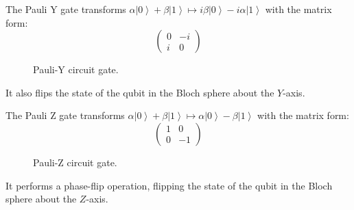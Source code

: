 \documentclass{article}
\newcommand{\ket}[1]{\ensuremath{\left|#1\right\rangle}}
\begin{document}
    \begin{definition}[Pauli Y]
      The Pauli Y gate transforms $\alpha \ket{0} + \beta \ket{1} \mapsto  i \beta \ket{0} - i \alpha \ket{1}$ with the matrix form: 
      \begin{equation} 
        \begin{pmatrix} 0 & -i \\ i & 0 \end{pmatrix}
      \end{equation}

      \begin{figure}[H]
        \centering 
        \caption{Pauli-Y circuit gate.} 
        \label{fig:pauliy}
      \end{figure}
      It also flips the state of the qubit in the Bloch sphere about the $Y$-axis. 
    \end{definition}

    \begin{definition}[Pauli Z]
      The Pauli Z gate transforms $\alpha \ket{0} + \beta \ket{1} \mapsto \alpha \ket{0} - \beta \ket{1}$ with the matrix form: 
      \begin{equation} 
        \begin{pmatrix} 1 & 0 \\ 0 & -1 \end{pmatrix}
      \end{equation}
      \begin{figure}[H]
        \centering 
        \caption{Pauli-Z circuit gate.} 
        \label{fig:pauliz}
      \end{figure}
      It performs a phase-flip operation, flipping the state of the qubit in the Bloch sphere about the $Z$-axis.
    \end{definition}
\end{document}
